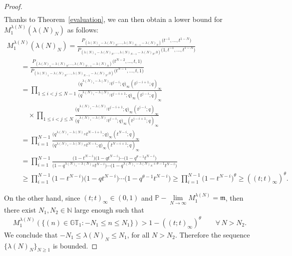 \documentclass[pdftex]{sigma}
\numberwithin{equation}{section}
\newcommand{\N}{\mathbb{N}}
\newcommand{\GT}{\mathbb{GT}}
\begin{document}
\begin{proof}
\begin{gather*}
\end{gather*}
Thanks to Theorem~\ref{evaluation}, we can then obtain a lower bound for $M^{\lambda(N)}_1 (\lambda(N)_N )$ as follows:
\begin{gather*}
M^{\lambda(N)}_1(\lambda(N)_N) = \frac{P_{(\lambda(N)_1 - \lambda(N)_N, \dots, \lambda(N)_{N-1}-\lambda(N)_N)}\big(t^{-1}, \dots, t^{1-N}\big)}{P_{(\lambda(N)_1 - \lambda(N)_N, \dots, \lambda(N)_{N-1}-\lambda(N)_N, 0)}\big(1, t^{-1}, \dots, t^{1-N}\big)}\\
\qquad{} = \frac{P_{(\lambda(N)_1 - \lambda(N)_N, \dots, \lambda(N)_{N-1}-\lambda(N)_N)}\big(t^{N-2}, \dots, t, 1\big)}{P_{(\lambda(N)_1 - \lambda(N)_N, \dots, \lambda(N)_{N-1}-\lambda(N)_N, 0)}\big(t^{N-1}, \dots, t, 1\big)}\\
\qquad{} = \prod_{1\leq i < j\leq N-1}{\frac{\big(q^{\lambda(N)_i - \lambda(N)_j}t^{j-i}; q\big)_{\infty}(t^{j-i+1}; q)_{\infty}}{\big(q^{\lambda(N)_i - \lambda(N)_j}t^{j-i+1}; q\big)_{\infty}(t^{j-i}; q)_{\infty}}}\\
\qquad\quad{}\times
\prod_{1\leq i < j\leq N}{\frac{\big(q^{\lambda(N)_i - \lambda(N)_j}t^{j-i+1}; q\big)_{\infty}(t^{j-i}; q)_{\infty}}{\big(q^{\lambda(N)_i - \lambda(N)_j}t^{j - i}; q\big)_{\infty}(t^{j-i+1}; q)_{\infty}}}\\
\qquad{} = \prod_{i=1}^{N-1}{\frac{\big(q^{\lambda(N)_i - \lambda(N)_N}t^{N-i+1}; q\big)_{\infty}(t^{N-i}; q)_{\infty}}{\big(q^{\lambda(N)_i - \lambda(N)_N}t^{N-i}; q\big)_{\infty}(t^{N-i+1}; q)_{\infty}}}\\
\qquad{} = \prod_{i=1}^{N-1}{\frac{\big(1 - t^{N-i}\big)\big(1 - qt^{N-i}\big)\cdots \big(1 - q^{\theta - 1}t^{N-i}\big)}{\big(1 - q^{\lambda(N)_i - \lambda(N)_N}t^{N-i}\big)\cdots \big(1 - q^{\lambda(N)_i - \lambda(N)_N + \theta - 1}t^{N-i}\big)}}\\
\qquad{} \geq \prod_{i=1}^{N-1}{\big(1 - t^{N-i}\big)\big(1 - qt^{N-i}\big)\cdots \big(1 - q^{\theta - 1}t^{N-i}\big)} \geq \prod_{i=1}^{N-1}{\big(1 - t^{N-i}\big)^{\theta}} \geq ( (t; t)_{\infty} )^{\theta}.
\end{gather*}

On the other hand, since $(t; t)_{\infty}\in (0, 1)$ and $\mathbb{P}-\lim\limits_{N\rightarrow\infty}{M^{\lambda(N)}_1} = \mathfrak{m}$, then there exist $N_1, N_2 \in \N$ large enough such that
\begin{gather*}
M^{\lambda(N)}_1\left(\{ (n)\in\GT_1\colon -N_1 \leq n \leq N_1\}\right) > 1 - ((t; t)_{\infty})^{\theta} \qquad \forall\, N > N_2.
\end{gather*}
We conclude that $-N_1 \leq \lambda(N)_N \leq N_1$, for all $N > N_2$.
Therefore the sequence $\{\lambda(N)_N\}_{N\geq 1}$ is bounded.
\end{proof}
\end{document}
